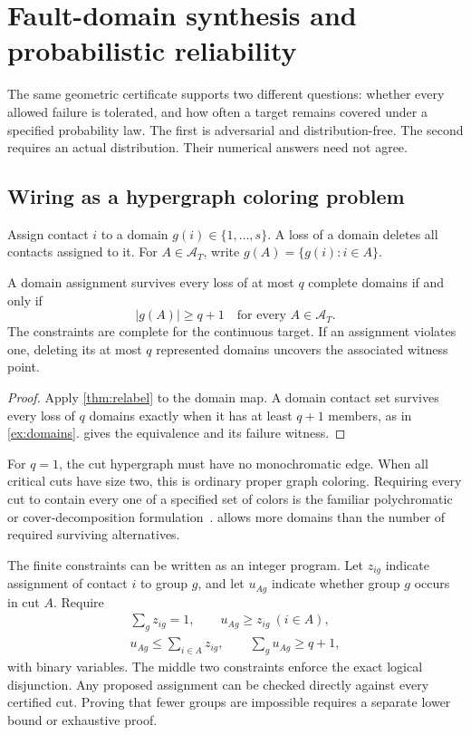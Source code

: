 \section{Fault-domain synthesis and probabilistic reliability}
\label{sec:reliability}
The same geometric certificate supports two different questions: whether every allowed failure is tolerated, and how often a target remains covered under a specified probability law. The first is adversarial and distribution-free. The second requires an actual distribution. Their numerical answers need not agree.

\subsection{Wiring as a hypergraph coloring problem}
Assign contact $i$ to a domain $g(i)\in\{1,\ldots,s\}$. A loss of a domain deletes all contacts assigned to it. For $A\in\mathcal A_T$, write $g(A)=\{g(i):i\in A\}$.

\begin{theorem}\label{thm:domain-design}
A domain assignment survives every loss of at most $q$ complete domains if and only if
\begin{equation}\label{eq:domain-design}
|g(A)|\ge q+1\quad\text{for every }A\in\mathcal A_T.
\end{equation}
The constraints are complete for the continuous target. If an assignment violates one, deleting its at most $q$ represented domains uncovers the associated witness point.
\end{theorem}
\begin{proof}
Apply \cref{thm:relabel} to the domain map. A domain contact set survives every loss of $q$ domains exactly when it has at least $q+1$ members, as in \cref{ex:domains}.  gives the equivalence and its failure witness.
\end{proof}

For $q=1$, the cut hypergraph must have no monochromatic edge. When all critical cuts have size two, this is ordinary proper graph coloring. Requiring every cut to contain every one of a specified set of colors is the familiar polychromatic or cover-decomposition formulation~\cite{polychromatic}.  allows more domains than the number of required surviving alternatives.

The finite constraints can be written as an integer program. Let $z_{ig}$ indicate assignment of contact $i$ to group $g$, and let $u_{Ag}$ indicate whether group $g$ occurs in cut $A$. Require
\[
\begin{gathered}
\sum_g z_{ig}=1,\qquad
u_{Ag}\ge z_{ig}\ (i\in A),\\
u_{Ag}\le\sum_{i\in A}z_{ig},\qquad
\sum_g u_{Ag}\ge q+1,
\end{gathered}
\]
with binary variables. The middle two constraints enforce the exact logical disjunction. Any proposed assignment can be checked directly against every certified cut. Proving that fewer groups are impossible requires a separate lower bound or exhaustive proof.


